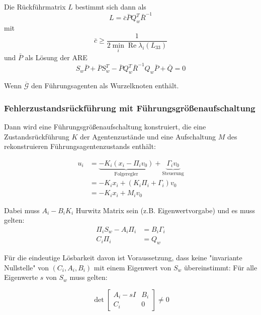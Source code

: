 Die Rückführmatrix $L$ bestimmt sich dann als
\begin{equation}
    L= \bar{c} \bar{P} Q_w^T \bar{R}^{-1}
\end{equation}
mit
\begin{equation}
    \bar{c} \geq \frac{1}{2 \min_{i}\operatorname{Re} \lambda_i(L_{33})}
\end{equation}
und $\bar{P}$ als Lösung der ARE
\begin{equation}
    S_w \bar{P} + \bar{P} S_w^T - \bar{P} Q_w^T \bar{R}^{-1} Q_w \bar{P} + \bar{Q} = 0
\end{equation}

Wenn $\overbar{\mathcal{G}}$ den Führungsagenten als Wurzelknoten enthält.

\subsubsection{Fehlerzustandsrückführung mit Führungsgrößenaufschaltung}
\label{sec:heterogen_regler}

Dann wird eine Führungsgrößenaufschaltung konstruiert, die eine Zustandsrückführung $K$
der Agentenzustände und eine Aufschaltung $M$ des rekonstruieren
Führungsagentenzustands enthält:

\begin{align}
    u_i &= \underbrace{-K_i (x_i - \Pi_i v_0)}_\text{Folgeregler}
    + \underbrace{\Gamma_i v_0}_\text{Steuerung} \\
    &= -K_i x_i + (K_i \Pi_i + \Gamma_i) v_0 \\
    &= -K_i x_i + M_i v_0
\end{align}

Dabei muss $A_i - B_i K_i$ Hurwitz Matrix sein (z.B. Eigenwertvorgabe) und es muss
gelten:
\begin{align}
    \Pi_i S_w - A_i \Pi_i &= B_i \Gamma_i \\
    C_i \Pi_i &= Q_w
\end{align}

Für die eindeutige Lösbarkeit davon ist Voraussetzung, dass keine "invariante Nullstelle"
von $(C_i, A_i, B_i)$ mit einem Eigenwert von $S_w$ übereinstimmt:
Für alle Eigenwerte $s$ von $S_w$ muss gelten:

\begin{equation}
    \det \begin{bmatrix}
        A_i -sI & B_i \\
        C_i & 0
    \end{bmatrix}
    \neq 0
\end{equation}

